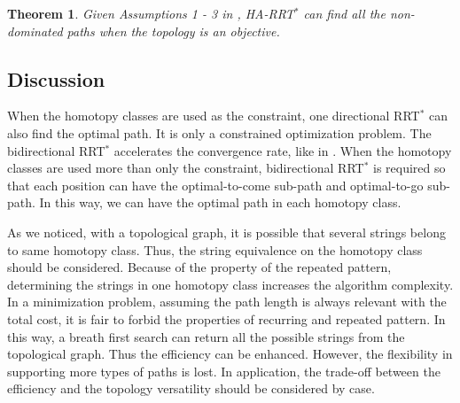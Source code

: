 \documentclass[letterpaper, 10 pt, conference]{ieeeconf}
\newtheorem{thm}{Theorem}
\begin{document}
\begin{thm}
\label{thm:homotopy_pref:optimal}
Given Assumptions 1 - 3 in \cite{Karaman-RSS-10}, 
HA-RRT$^{*}$ can find all the non-dominated paths when the topology is an objective.
\end{thm}


\subsection{Discussion}

When the homotopy classes are used as the constraint, one directional RRT$^{*}$ can also find the optimal path.
It is only a constrained optimization problem.
The bidirectional RRT$^{*}$ accelerates the convergence rate, like in \cite{starek2014bidirectional}.
When the homotopy classes are used more than only the constraint, bidirectional RRT$^{*}$ is required so that each position can have the optimal-to-come sub-path and optimal-to-go sub-path.
In this way, we can have the optimal path in each homotopy class.

As we noticed, with a topological graph, it is possible that several strings belong to same homotopy class.
Thus, the string equivalence on the homotopy class should be considered.
Because of the property of the repeated pattern, determining the strings in one homotopy class increases the algorithm complexity.
In a minimization problem, assuming the path length is always relevant with the total cost, it is fair to forbid the properties of recurring and repeated pattern.
In this way, a breath first search can return all the possible strings from the topological graph.
Thus the efficiency can be enhanced.
However, the flexibility in supporting more types of paths is lost.
In application, the trade-off between the efficiency and the topology versatility should be considered by case.
\end{document}
